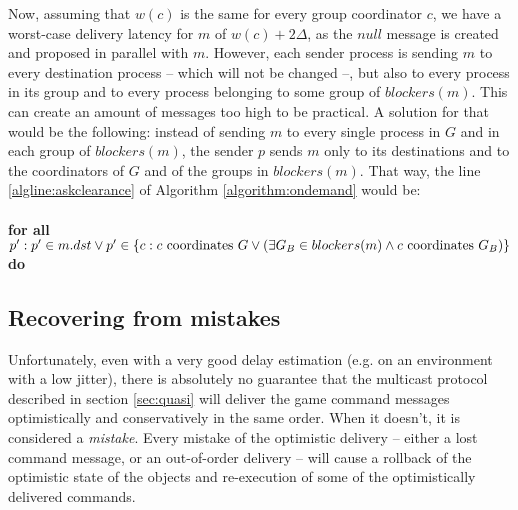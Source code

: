 \documentclass[times, 10pt]{article}
\begin{document}
Now, assuming that $w(c)$ is the same for every group coordinator $c$, we have a worst-case delivery latency for $m$ of $w(c) + 2\Delta$, as the $null$ message is created and proposed in parallel with $m$. However, each sender process is sending $m$ to every destination process -- which will not be changed --, but also to every process in its group and to every process belonging to some group of $blockers(m)$. This can create an amount of messages too high to be practical. A solution for that would be the following: instead of sending $m$ to every single process in $G$ and in each group of $blockers(m)$, the sender $p$ sends $m$ only to its destinations and to the coordinators of $G$ and of the groups in $blockers(m)$. That way, the line \ref{algline:askclearance} of Algorithm \ref{algorithm:ondemand} would be:
\\
\\
\textbf{for all} $p' : p' \in m.dst \vee
\\p' \in \{c : c\text{ coordinates }G \vee (\exists G_B \in blockers(m) \wedge c\text{ coordinates }G_B)\}$
\\\textbf{do}



\subsection{Recovering from mistakes}

Unfortunately, even with a very good delay estimation (e.g. on an environment with a low jitter), there is absolutely no guarantee that the multicast protocol described  in section \ref{sec:quasi} will deliver the game command messages optimistically and conservatively in the same order. When it doesn't, it is considered a \emph{mistake}. Every mistake of the optimistic delivery -- either a lost command message, or an out-of-order delivery -- will cause a rollback of the optimistic state of the objects and re-execution of some of the optimistically delivered commands.
\end{document}
